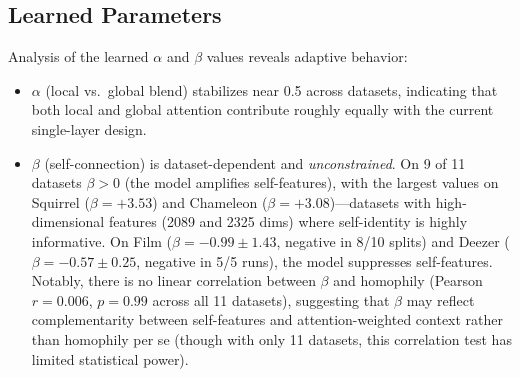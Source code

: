 \documentclass[sigconf]{acmart}
\begin{document}
\subsection{Learned Parameters}

Analysis of the learned $\alpha$ and $\beta$ values reveals adaptive behavior:
\begin{itemize}
\item $\alpha$ (local vs.~global blend) stabilizes near 0.5 across datasets, indicating that both local and global attention contribute roughly equally with the current single-layer design.
\item $\beta$ (self-connection) is dataset-dependent and \emph{unconstrained}. On 9 of 11 datasets $\beta > 0$ (the model amplifies self-features), with the largest values on Squirrel ($\beta = +3.53$) and Chameleon ($\beta = +3.08$)---datasets with high-dimensional features (2089 and 2325 dims) where self-identity is highly informative. On Film ($\beta = -0.99 \pm 1.43$, negative in 8/10 splits) and Deezer ($\beta = -0.57 \pm 0.25$, negative in 5/5 runs), the model suppresses self-features. Notably, there is no linear correlation between $\beta$ and homophily (Pearson $r = 0.006$, $p = 0.99$ across all 11 datasets), suggesting that $\beta$ may reflect complementarity between self-features and attention-weighted context rather than homophily per se (though with only 11 datasets, this correlation test has limited statistical power).
\end{itemize}
\end{document}
